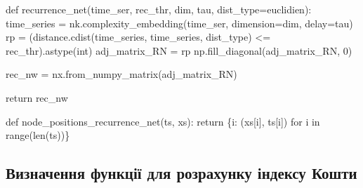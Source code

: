\documentclass[
  letterpaper,
]{report}
\newenvironment{Shaded}{\begin{snugshade}}{\end{snugshade}}
\newcommand{\BuiltInTok}[1]{\textcolor[rgb]{0.00,0.23,0.31}{#1}}
\newcommand{\ControlFlowTok}[1]{\textcolor[rgb]{0.00,0.23,0.31}{#1}}
\newcommand{\DecValTok}[1]{\textcolor[rgb]{0.68,0.00,0.00}{#1}}
\newcommand{\KeywordTok}[1]{\textcolor[rgb]{0.00,0.23,0.31}{#1}}
\newcommand{\NormalTok}[1]{\textcolor[rgb]{0.00,0.23,0.31}{#1}}
\newcommand{\OperatorTok}[1]{\textcolor[rgb]{0.37,0.37,0.37}{#1}}
\newcommand{\StringTok}[1]{\textcolor[rgb]{0.13,0.47,0.30}{#1}}
\begin{document}
\begin{Shaded}
\begin{Highlighting}[]
\KeywordTok{def}\NormalTok{ recurrence\_net(time\_ser, rec\_thr, dim, tau, dist\_type}\OperatorTok{=}\StringTok{\textquotesingle{}euclidien\textquotesingle{}}\NormalTok{):}
\NormalTok{    time\_series }\OperatorTok{=}\NormalTok{ nk.complexity\_embedding(time\_ser, dimension}\OperatorTok{=}\NormalTok{dim, delay}\OperatorTok{=}\NormalTok{tau)}
\NormalTok{    rp }\OperatorTok{=}\NormalTok{ (distance.cdist(time\_series, time\_series, dist\_type) }\OperatorTok{\textless{}=}\NormalTok{ rec\_thr).astype(}\BuiltInTok{int}\NormalTok{)}
\NormalTok{    adj\_matrix\_RN }\OperatorTok{=}\NormalTok{ rp}
\NormalTok{    np.fill\_diagonal(adj\_matrix\_RN, }\DecValTok{0}\NormalTok{)}

\NormalTok{    rec\_nw }\OperatorTok{=}\NormalTok{ nx.from\_numpy\_matrix(adj\_matrix\_RN)}
    
    \ControlFlowTok{return}\NormalTok{ rec\_nw}

\KeywordTok{def}\NormalTok{ node\_positions\_recurrence\_net(ts, xs):}
    \ControlFlowTok{return}\NormalTok{ \{i: (xs[i], ts[i]) }\ControlFlowTok{for}\NormalTok{ i }\KeywordTok{in} \BuiltInTok{range}\NormalTok{(}\BuiltInTok{len}\NormalTok{(ts))\}}
\end{Highlighting}
\end{Shaded}

\hypertarget{ux432ux438ux437ux43dux430ux447ux435ux43dux43dux44f-ux444ux443ux43dux43aux446ux456ux457-ux434ux43bux44f-ux440ux43eux437ux440ux430ux445ux443ux43dux43aux443-ux456ux43dux434ux435ux43aux441ux443-ux43aux43eux448ux442ux438}{%
\subsection{Визначення функції для розрахунку індексу
Кошти}\label{ux432ux438ux437ux43dux430ux447ux435ux43dux43dux44f-ux444ux443ux43dux43aux446ux456ux457-ux434ux43bux44f-ux440ux43eux437ux440ux430ux445ux443ux43dux43aux443-ux456ux43dux434ux435ux43aux441ux443-ux43aux43eux448ux442ux438}}
\end{document}
